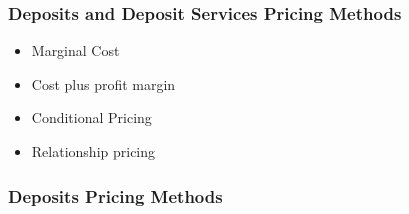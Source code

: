 \subsubsection{Deposits and Deposit Services Pricing Methods}
\begin{itemize}
\item Marginal Cost
\item Cost plus profit margin
\item Conditional Pricing
\item Relationship pricing
\end{itemize}



\subsubsection{Deposits Pricing Methods}
